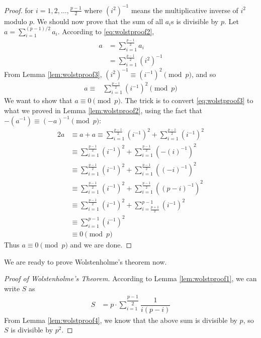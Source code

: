 \documentclass[12pt]{subfile}
\begin{document}
\begin{proof}
			for $i=1,2,\ldots,\frac{p-1}{2}$ where $(i^2)^{-1}$ means the multiplicative inverse of $i^2$ modulo $p$. We should now prove that the sum of all $a_i$s is divisible by $p$. Let $ a=\sum_{i=1}^{(p-1)/2} a_i$. According to \eqref{eq:wolstproof2},
				\begin{align*}
					a
						& = \sum_{i=1}^{\frac{p-1}{2}} a_i\\
						& = \sum_{i=1}^{\frac{p-1}{2}} (i^2)^{-1}
				\end{align*}
			From Lemma \ref{lem:wolstproof3},  $(i^2)^{-1} \equiv (i^{-1})^{2} \pmod p$, and so
				\begin{align}\label{eq:wolstproof3}
					a \equiv
						& \sum_{i=1}^{\frac{p-1}{2}} (i^{-1})^{2} \pmod p
				\end{align}
			We want to show that $a \equiv 0 \pmod p$. The trick is to convert \eqref{eq:wolstproof3} to what we proved in Lemma \ref{lem:wolstproof2}, using the fact that $-(a^{-1}) \equiv (-a)^{-1} \pmod p$:
				\begin{align*}
					2a
						&\equiv a+a \equiv \sum_{i=1}^{\frac{p-1}{2}} (i^{-1})^{2} + \sum_{i=1}^{\frac{p-1}{2}} (i^{-1})^{2}\\
						& \equiv \sum_{i=1}^{\frac{p-1}{2}} (i^{-1})^{2} + \sum_{i=1}^{\frac{p-1}{2}} (-(i)^{-1})^{2}  \\
						&\equiv \sum_{i=1}^{\frac{p-1}{2}} (i^{-1})^{2} + \sum_{i=1}^{\frac{p-1}{2}} ((-i)^{-1})^{2}\\
						& \equiv \sum_{i=1}^{\frac{p-1}{2}} (i^{-1})^{2} + \sum_{i=1}^{\frac{p-1}{2}} ((p-i)^{-1})^{2}\\
						& \equiv \sum_{i=1}^{\frac{p-1}{2}} (i^{-1})^{2} + \sum_{i=\frac{p+1}{2}}^{p-1} (i^{-1})^{2}\\
						& \equiv \sum_{i=1}^{p-1} (i^{-1})^{2}\\
						& \equiv 0 \pmod p
				\end{align*}
			Thus $a \equiv 0 \pmod p$ and we are done.
		\end{proof}
	We are ready to prove Wolstenholme's theorem now.
		\begin{proof}[Proof of Wolstenholme's Theorem]
			According to Lemma \ref{lem:wolstproof1}, we can write $S$ as
			\begin{align*}
				S
					& = p \cdot \sum_{i=1}^{\dfrac{p-1}{2}} \dfrac{1}{i(p-i)}
			\end{align*}
			From Lemma \ref{lem:wolstproof4}, we know that the above sum is divisible by $p$, so $S$ is divisible by $p^2$.
		\end{proof}
\end{document}
